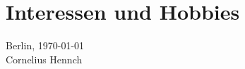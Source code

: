 \documentclass[11pt, a4paper, roman]{moderncv}        %
\renewcommand*{\bibliographyitemlabel}{[\arabic{enumiv}]}
\begin{document}
\renewcommand{\refname}{Publikationen}
\nocite{*}



\section{Interessen und Hobbies}
\bigskip


Berlin, \today\\[.5em]
Cornelius Hennch
\end{document}
